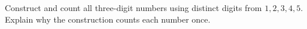 Construct and count all three-digit numbers using distinct digits from $1,2,3,4,5$. Explain why the construction counts each number once.

